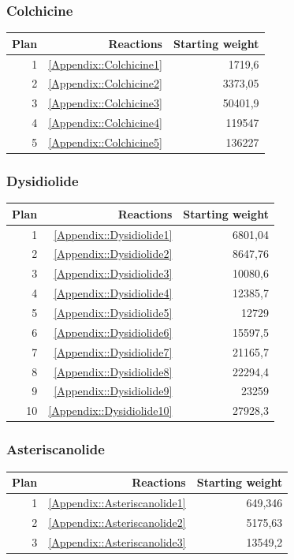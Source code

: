 \documentclass[a4paper,10pt,titlepage]{paper}
\begin{document}
\subsubsection{Colchicine} 
\begin{table}[H]
\centering
\begin{tabular}{|r|r|r|}
\hline
Plan & Reactions & Starting weight \\ \hline
1 & \ref{Appendix::Colchicine1} & 1719,6 \\\hline
2 & \ref{Appendix::Colchicine2} & 3373,05 \\\hline
3 & \ref{Appendix::Colchicine3} & 50401,9 \\\hline
4 & \ref{Appendix::Colchicine4} & 119547 \\\hline
5 & \ref{Appendix::Colchicine5} & 136227 \\\hline
\end{tabular}
\end{table}

\subsubsection{Dysidiolide}
\begin{table}[H]
\centering
\begin{tabular}{|r|r|r|}
\hline
Plan & Reactions & Starting weight \\ \hline
1 & \ref{Appendix::Dysidiolide1} & 6801,04 \\\hline
2 & \ref{Appendix::Dysidiolide2} & 8647,76 \\\hline
3 & \ref{Appendix::Dysidiolide3} & 10080,6 \\\hline
4 & \ref{Appendix::Dysidiolide4} & 12385,7 \\\hline
5 & \ref{Appendix::Dysidiolide5} & 12729 \\\hline
6 & \ref{Appendix::Dysidiolide6} & 15597,5 \\\hline
7 & \ref{Appendix::Dysidiolide7} & 21165,7 \\\hline
8 & \ref{Appendix::Dysidiolide8} & 22294,4 \\\hline
9 & \ref{Appendix::Dysidiolide9} & 23259 \\\hline
10 & \ref{Appendix::Dysidiolide10} & 27928,3 \\\hline
\end{tabular}
\end{table}

\subsubsection{Asteriscanolide}
\begin{table}[H]
\centering
\begin{tabular}{|r|r|r|}
\hline
Plan & Reactions & Starting weight \\ \hline
1 & \ref{Appendix::Asteriscanolide1} & 649,346 \\\hline
2 & \ref{Appendix::Asteriscanolide2} & 5175,63 \\\hline
3 & \ref{Appendix::Asteriscanolide3} & 13549,2 \\\hline
\end{tabular}
\end{table}
\end{document}
